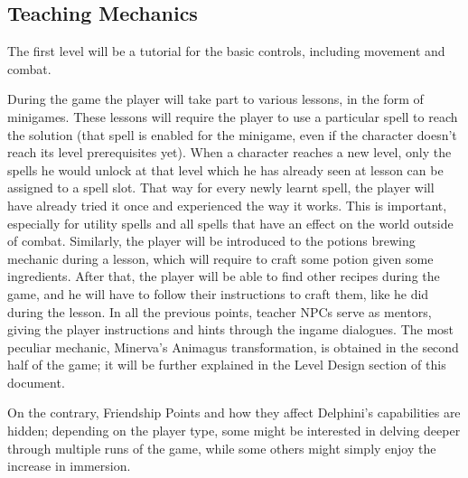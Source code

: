 \pagebreak

\subsection{Teaching Mechanics}

The first level will be a tutorial for the basic controls, including movement and combat.

During the game the player will take part to various lessons, in the form of minigames. These lessons will require the player to use a particular spell to reach the solution (that spell is enabled for the minigame, even if the character doesn't reach its level prerequisites yet).
When a character reaches a new level, only the spells he would unlock at that level which he has already seen at lesson can be assigned to a spell slot. That way for every newly learnt spell, the player will have already tried it once and experienced the way it works.
This is important, especially for utility spells and all spells that have an effect on the world outside of combat.
Similarly, the player will be introduced to the potions brewing mechanic during a lesson, which will require to craft some potion given some ingredients. After that, the player will be able to find other recipes during the game, and he will have to follow their instructions to craft them, like he did during the lesson.
In all the previous points, teacher NPCs serve as mentors, giving the player instructions and hints through the ingame dialogues.
The most peculiar mechanic, Minerva's Animagus transformation, is obtained in the second half of the game; it will be further explained in the Level Design section of this document.

On the contrary, Friendship Points and how they affect Delphini's capabilities are hidden; depending on the player type, some might be interested in delving deeper through multiple runs of the game, while some others might simply enjoy the increase in immersion.

\pagebreak